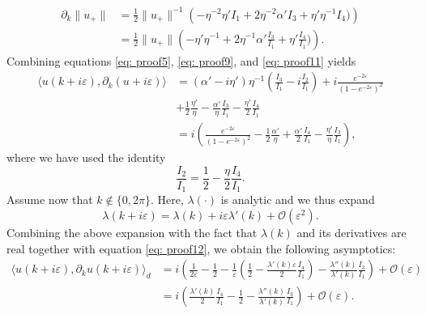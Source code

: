\documentclass[a4paper,reqno,twoside]{amsart}
\numberwithin{equation}{section}
\theoremstyle{definition}
\newtheorem{remark}[theorem]{Remark}
\newcommand{\<}{\ensuremath \leq}
\renewcommand{\>}{\ensuremath \geq}
\renewcommand{\epsilon}{\varepsilon}
\begin{document}
\begin{equation}\label{eq: proof11}
    \begin{aligned}
         \partial_k\lVert u_+\lVert &=\frac{1}{2}\lVert u_+\rVert^{-1}\left(-\eta^{-2}\eta'I_1 + 2\eta^{-2}\alpha'I_3 + \eta'\eta^{-1}I_4)\right)\\
         &=\frac{1}{2}\lVert u_+\rVert\left(-\eta'\eta^{-1} + 2\eta^{-1}\alpha'\frac{I_3}{I_1} + \eta'\frac{I_4}{I_1})\right).
    \end{aligned}
\end{equation}
Combining equations \eqref{eq: proof5}, \eqref{eq: proof9}, and \eqref{eq: proof11} yields
\begin{equation}\label{eq: proof12}
    \begin{aligned}
         \langle u(k + i\epsilon),\partial_k (u+i\epsilon)\rangle &= (\alpha'-i\eta')\eta^{-1}\left(\frac{I_3}{I_1} - i\frac{I_2}{I_1}\right) + i\frac{e^{-2\epsilon}}{(1- e^{-2\epsilon} )^2}\\
         &+\frac{1}{2}\frac{\eta'}{\eta} -\frac{\alpha'}{\eta}\frac{I_3}{I_1} - \frac{\eta'}{2}\frac{I_4}{I_1}\\
         &=i\left(\frac{e^{-2\epsilon}}{(1- e^{-2\epsilon})^2} -\frac{1}{2}\frac{\alpha'}{\eta} + \frac{\alpha'}{2}\frac{I_4}{I_1}- \frac{\eta'}{\eta}\frac{I_3}{I_1}\right),
    \end{aligned}
\end{equation}
where we have used the identity
\begin{equation}
    \frac{I_2}{I_1}=\frac{1}{2}-\frac{\eta}{2}\frac{I_4}{I_1}.
\end{equation}
Assume now that $k \notin\{0,2\pi\}$. Here, $\lambda(\cdot)$ is analytic \cite{kuchment2016overview} and we thus expand 
\begin{equation}
    \lambda(k + i\epsilon) = \lambda(k) + i\epsilon\lambda'(k) + \mathcal{O}(\epsilon^2).
\end{equation}
Combining the above expansion with the fact that $\lambda(k)$ and its derivatives are real together with equation \eqref{eq: proof12}, we obtain the following asymptotics:
\begin{equation}\label{eq: proof13}
    \begin{aligned}
        \langle u(k +i\epsilon),\partial_ku(k + i\epsilon)\rangle_d &= i\left( \frac{1}{2\epsilon}-\frac{1}{2} -  \frac{1}{\epsilon}\left(\frac{1}{2} - \frac{\lambda'(k)\epsilon}{2}\frac{I_4}{I_1}\right) -\frac{\lambda''(k)}{\lambda'(k )}\frac{I_3}{I_1}\right) + \mathcal{O}(\epsilon)\\
        &=i\left(\frac{\lambda'(k)}{2}\frac{I_4}{I_1}-\frac{1}{2}-\frac{\lambda''(k)}{\lambda'(k )}\frac{I_3}{I_1}\right) + \mathcal{O}(\epsilon).
    \end{aligned}
\end{equation}
\end{document}
